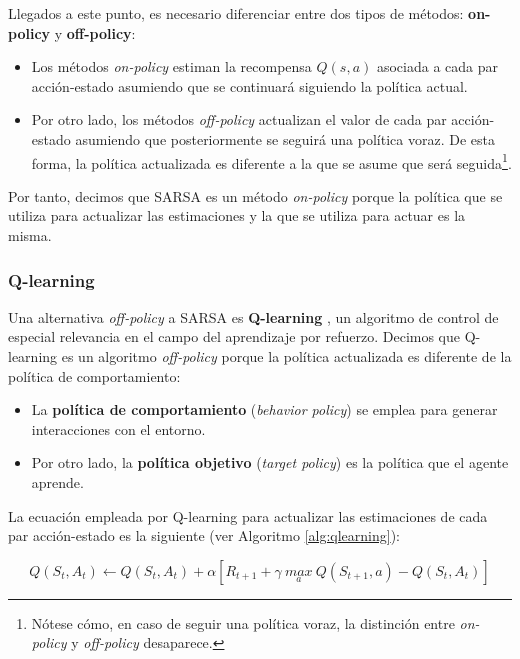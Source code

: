 Llegados a este punto, es necesario diferenciar entre dos tipos de métodos: \textbf{on-policy} y \textbf{off-policy}:

\begin{itemize}
    \item Los métodos \textit{on-policy} estiman la recompensa $Q(s,a)$ asociada a cada par acción-estado asumiendo que se continuará siguiendo la política actual.
    \item Por otro lado, los métodos \textit{off-policy} actualizan el valor de cada par acción-estado asumiendo que posteriormente se seguirá una política voraz. De esta forma, la política actualizada es diferente a la que se asume que será seguida\footnote{Nótese cómo, en caso de seguir una política voraz, la distinción entre \textit{on-policy} y \textit{off-policy} desaparece.}.
\end{itemize}

Por tanto, decimos que SARSA es un método \textit{on-policy} porque la política que se utiliza para actualizar las estimaciones y la que se utiliza para actuar es la misma. 

\subsubsection{Q-learning}

Una alternativa \textit{off-policy} a SARSA es \textbf{Q-learning} \cite{watkins1992q}, un algoritmo de control de especial relevancia en el campo del aprendizaje por refuerzo. Decimos que Q-learning es un algoritmo \textit{off-policy} porque la política actualizada es diferente de la política de comportamiento:

\begin{itemize}
    \item La \textbf{política de comportamiento} (\textit{behavior policy}) se emplea para generar interacciones con el entorno.
    \item Por otro lado, la \textbf{política objetivo} (\textit{target policy}) es la política que el agente aprende.
\end{itemize}

La ecuación empleada por Q-learning para actualizar las estimaciones de cada par acción-estado es la siguiente (ver Algoritmo \ref{alg:qlearning}):

\begin{equation}
    Q(S_t, A_t) \leftarrow Q(S_t, A_t) + \alpha[R_{t+1} + \gamma\ \underset{a}{max}\ Q(S_{t+1}, a) - Q(S_t, A_t)]
\end{equation}

